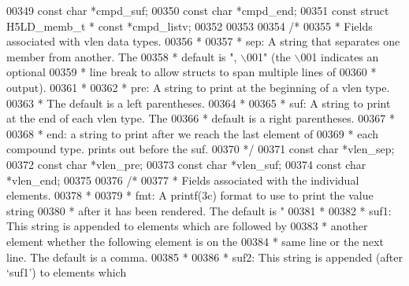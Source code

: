 \begin{DoxyCode}
{{{{{{{{{{{{{{00349     \textcolor{keyword}{const} \textcolor{keywordtype}{char}  *cmpd\_suf;
00350     \textcolor{keyword}{const} \textcolor{keywordtype}{char}  *cmpd\_end;
00351     \textcolor{keyword}{const} \textcolor{keyword}{struct }H5LD\_memb\_t * \textcolor{keyword}{const} *cmpd\_listv;
00352 
00353 
00354     \textcolor{comment}{/*}
00355 \textcolor{comment}{     * Fields associated with vlen data types.}
00356 \textcolor{comment}{     *}
00357 \textcolor{comment}{     *   sep:       A string that separates one member from another.  The}
00358 \textcolor{comment}{     *              default is ", \(\backslash\)001" (the \(\backslash\)001 indicates an optional}
00359 \textcolor{comment}{     *              line break to allow structs to span multiple lines of}
00360 \textcolor{comment}{     *              output).}
00361 \textcolor{comment}{     *}
00362 \textcolor{comment}{     *   pre:       A string to print at the beginning of a vlen type.}
00363 \textcolor{comment}{     *              The default is a left parentheses.}
00364 \textcolor{comment}{     *}
00365 \textcolor{comment}{     *   suf:       A string to print at the end of each vlen type.  The}
00366 \textcolor{comment}{     *              default is a right parentheses.}
00367 \textcolor{comment}{     *}
00368 \textcolor{comment}{     *   end:       a string to print after we reach the last element of}
00369 \textcolor{comment}{     *              each compound type. prints out before the suf.}
00370 \textcolor{comment}{     */}
00371     \textcolor{keyword}{const} \textcolor{keywordtype}{char}  *vlen\_sep;
00372     \textcolor{keyword}{const} \textcolor{keywordtype}{char}  *vlen\_pre;
00373     \textcolor{keyword}{const} \textcolor{keywordtype}{char}  *vlen\_suf;
00374     \textcolor{keyword}{const} \textcolor{keywordtype}{char}  *vlen\_end;
00375 
00376     \textcolor{comment}{/*}
00377 \textcolor{comment}{     * Fields associated with the individual elements.}
00378 \textcolor{comment}{     *}
00379 \textcolor{comment}{     *   fmt:       A printf(3c) format to use to print the value string}
00380 \textcolor{comment}{     *              after it has been rendered.  The default is "%
00381 \textcolor{comment}{     *}
00382 \textcolor{comment}{     *   suf1:      This string is appended to elements which are followed by}
00383 \textcolor{comment}{     *              another element whether the following element is on the}
00384 \textcolor{comment}{     *              same line or the next line.  The default is a comma.}
00385 \textcolor{comment}{     *}
00386 \textcolor{comment}{     *   suf2:      This string is appended (after `suf1') to elements which}
}}}}}}}}}}}}}}}
\end{DoxyCode}
